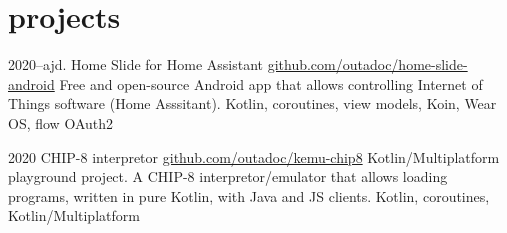 \documentclass[]{friggeri-cv}
\begin{document}
\section{projects}

\begin{entrylist}
    \entry
    {2020--ajd.}
    {Home Slide for Home Assistant}
    {\href{https://github.com/outadoc/home-slide-android}{github.com/outadoc/home-slide-android}}
    {Free and open-source Android app that allows controlling Internet of Things software (Home Asssitant).}
    {Kotlin, coroutines, view models, Koin, Wear OS, flow OAuth2}

    \entry
    {2020}
    {CHIP-8 interpretor}
    {\href{https://github.com/outadoc/kemu-chip8}{github.com/outadoc/kemu-chip8}}
    {Kotlin/Multiplatform playground project. A CHIP-8 interpretor/emulator that allows loading programs, written in pure Kotlin, with Java and JS clients.}
    {Kotlin, coroutines, Kotlin/Multiplatform}

\end{entrylist}
\end{document}
